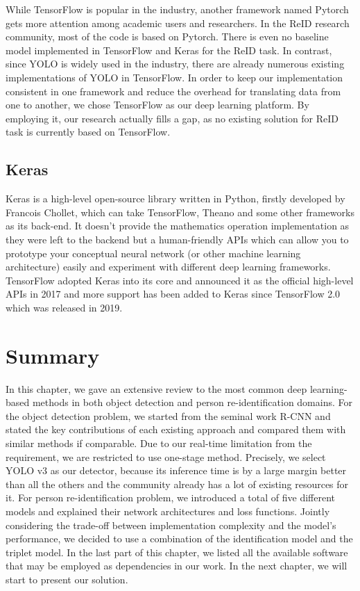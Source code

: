 While TensorFlow is popular in the industry, another framework named Pytorch
gets more attention among academic users and researchers. In the ReID research 
community, most of the code is based on Pytorch. There is even no baseline
model implemented in TensorFlow and Keras for the ReID task.
In contrast, since YOLO is widely used in the industry, there are already numerous
existing implementations of YOLO in TensorFlow. In order to keep our
implementation consistent in one framework and reduce the overhead for
translating data from one to another, we chose TensorFlow as our deep
learning platform. By employing it, our research actually fills a gap, 
as no existing solution for ReID task is currently based on TensorFlow.


\subsection{Keras}

Keras \cite{keras-framework} is a high-level open-source library written in
Python, firstly developed by Francois Chollet, which can take TensorFlow,
Theano and some other frameworks as its back-end. It doesn't provide the
mathematics operation implementation as they were left to the backend but a
human-friendly APIs which can allow you to prototype your conceptual
neural network (or other machine learning architecture) easily and experiment
with different deep learning frameworks. TensorFlow adopted Keras into its core
and announced it as the official high-level APIs in 2017 and more support has been 
added to Keras since TensorFlow 2.0 which was released in 2019.

\section{Summary}

In this chapter, we gave an extensive review to the most common deep
learning-based methods in both object detection and person re-identification
domains.
%
For the object detection problem, we started from the seminal work R-CNN
and stated the key contributions of each existing approach and compared them
with similar methods if comparable. Due to our real-time limitation from the
requirement, we are restricted to use one-stage method. Precisely, we select
YOLO v3 as our detector, because its inference time is by a large margin better than
all the others and the community already has a lot of existing resources for it.
%
For person re-identification problem, we introduced a total of five different 
models and explained their network architectures and loss functions. Jointly 
considering the trade-off between implementation complexity and the model's 
performance, we decided to use a combination of the identification model and 
the triplet model.
%
In the last part of this chapter, we listed all the available
software that may be employed as dependencies in our work. In the next chapter, we 
will start to present our solution.

